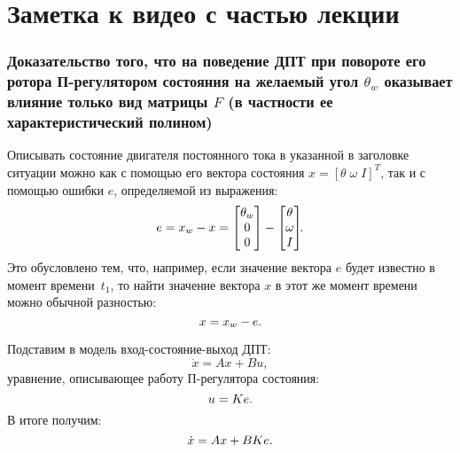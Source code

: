 \documentclass[12pt,a4paper,openany]{extarticle}
\begin{document}
\renewcommand{\themyappcounter}{\Alph{myappcounter}}
\newcommand{\myappnum}{\refstepcounter{myappcounter}\themyappcounter}

\part*{Заметка к видео с частью лекции}

\section{Доказательство того, что на поведение ДПТ при повороте его ротора П-регулятором состояния на желаемый угол $\theta_w$ оказывает влияние только вид матрицы $F$ (в частности ее характеристический полином)}
\hspace*{\parindent}Описывать состояние двигателя постоянного тока в указанной в заголовке ситуации можно как с помощью его вектора состояния $x = [\theta\;\omega\; I]^T$, так и с помощью ошибки $e$, определяемой из выражения:
\begin{equation}\label{eq:e_xw_x}
e = x_w - x = 
\begin{bmatrix}
\theta_w \\ 0 \\0
\end{bmatrix}
-
\begin{bmatrix}
\theta \\ \omega \\ I
\end{bmatrix}\!\!\ldotp
\end{equation}
Это обусловлено тем, что, например, если значение вектора $e$ будет известно в момент времени~$t_1$, то найти значение вектора $x$ в этот же момент времени можно обычной разностью:
\begin{equation}\label{eq:x_xw_e}
x = x_w-e\ldotp
\end{equation}

Подставим в модель вход-состояние-выход ДПТ:
\begin{equation}
\dot{x} = Ax+Bu,
\end{equation}
уравнение, описывающее работу П-регулятора состояния:
\begin{equation}
u = Ke\ldotp
\end{equation}
В итоге получим:
\begin{equation}\label{eq:dx_Ax_BKe}
\dot{x} = Ax+BKe\ldotp
\end{equation}
\end{document}
